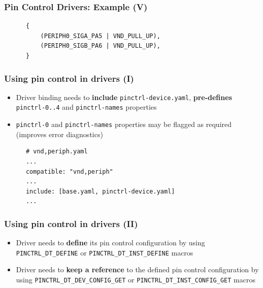 \documentclass[handout]{beamer}
\begin{document}
\begin{frame}[fragile]
  \frametitle{Pin Control Drivers: Example (V)}

  \begin{listing}[H]
    \begin{verbatim}
      {
          (PERIPH0_SIGA_PA5 | VND_PULL_UP),
          (PERIPH0_SIGB_PA6 | VND_PULL_UP),
      }
    \end{verbatim}
    \caption{Result of \texttt{Z\_PINCTRL\_STATE\_PINS\_INIT} when
      invoked for \texttt{periph0}, \texttt{default} state}
  \end{listing}
\end{frame}

\begin{frame}[fragile]
  \frametitle{Using pin control in drivers (I)}

  \begin{itemize}
    \item<1-> Driver binding needs to \textbf{include}
          \texttt{pinctrl-device.yaml}, \textbf{pre-defines}
          \texttt{pinctrl-0..4} and \texttt{pinctrl-names} properties
    \item<2-> \texttt{pinctrl-0} and \texttt{pinctrl-names} properties may
           be flagged as required (improves error diagnostics)
  \end{itemize}

  \begin{listing}[H]
    \begin{verbatim}
      # vnd,periph.yaml
      ...
      compatible: "vnd,periph"
      ...
      include: [base.yaml, pinctrl-device.yaml]
      ...
    \end{verbatim}
    \caption{\texttt{vnd,periph} binding includes \texttt{pinctrl-device.yaml}}
  \end{listing}
\end{frame}

\begin{frame}
  \frametitle{Using pin control in drivers (II)}

  \begin{itemize}
    \item<1-> Driver needs to \textbf{define} its pin control configuration by
          using \texttt{PINCTRL\_DT\_DEFINE} or
          \texttt{PINCTRL\_DT\_INST\_DEFINE} macros
    \item<2-> Driver needs to \textbf{keep a reference} to the defined pin
          control configuration by using \texttt{PINCTRL\_DT\_DEV\_CONFIG\_GET}
          or \texttt{PINCTRL\_DT\_INST\_CONFIG\_GET} macros
  \end{itemize}
\end{frame}
\end{document}
